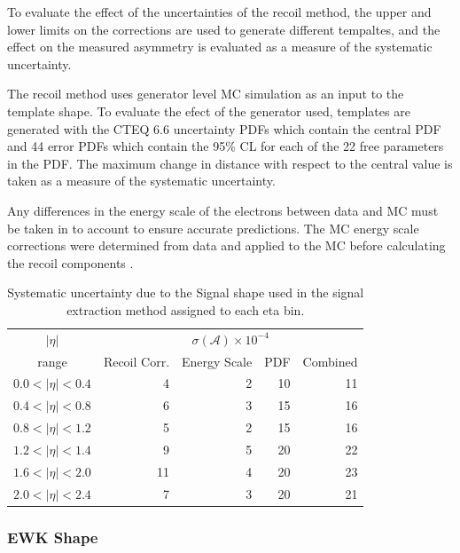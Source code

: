 To evaluate the effect of the uncertainties of the recoil method, the upper and
lower limits on the corrections are used to generate different tempaltes, and
the effect on the measured asymmetry is evaluated as a measure of the
systematic uncertainty.

The recoil method uses generator level \ac{MC} simulation as an input to the
template shape. To evaluate the efect of the generator used, templates are
generated with the CTEQ 6.6 
uncertainty \acp{PDF} which contain the central \ac{PDF} and 44 error \acp{PDF}
which contain the \unit{95}{\%} \ac{CL} for each of the 22 free parameters in
the \ac{PDF}. The maximum change in distance with respect to the central value
is taken as a measure of the systematic uncertainty.

Any differences in the energy scale of the electrons between data and \ac{MC}
must be taken in to account to ensure accurate \ETm predictions. The \ac{MC} energy
scale corrections were determined from \PZ data and applied to the \PZ \ac{MC}
before calculating the recoil components \cite{recoil}.

\begin{table}[htbp]
\begin{center}
\begin{tabular}{crrrr}
    \toprule
$|\eta|$   & \multicolumn{4}{c}{$\sigma(\mathcal{A}) \times 10^{-4}$}\\
range      & Recoil Corr. & Energy Scale & PDF & Combined \\
\midrule
$0.0<|\eta|<0.4$ &  4 & 2 & 10  & 11 \\
$0.4<|\eta|<0.8$ &  6 & 3 & 15  & 16 \\
$0.8<|\eta|<1.2$ &  5 & 2 & 15  & 16 \\
$1.2<|\eta|<1.4$ &  9 & 5 & 20  & 22 \\
$1.6<|\eta|<2.0$ & 11 & 4 & 20  & 23 \\
$2.0<|\eta|<2.4$ &  7 & 3 & 20  & 21 \\
    \bottomrule
\end{tabular}
\caption{\label{tab:systSIG}Systematic uncertainty due to the Signal \ETm shape used in the signal
extraction method assigned to each eta bin.}
\end{center}
\end{table}

\subsubsection{\ac{EWK} \ETm Shape}

